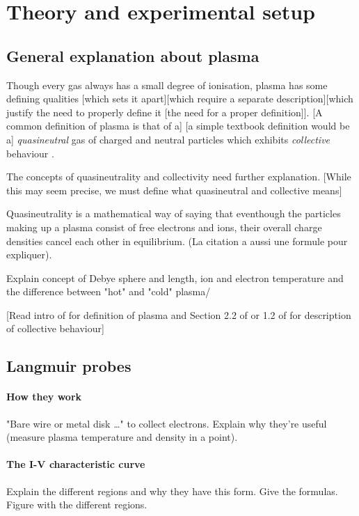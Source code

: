 \section{Theory and experimental setup}

\subsection{General explanation about plasma}
Though every gas always has a small degree of ionisation, plasma has some defining qualities [which sets it apart][which require a separate description][which justify the need to properly define it [the need for a proper definition]].
[A common definition of plasma is that of a] [a simple textbook definition would be a] \emph{quasineutral} gas of charged and neutral particles which exhibits \emph{collective} behaviour \cite{chen_introduction_1990}.

The concepts of quasineutrality and collectivity need further explanation.
[While this may seem precise, we must define what quasineutral and collective means]

Quasineutrality is a mathematical way of saying that eventhough the particles making up a plasma consist of free electrons and ions, 
their overall charge densities cancel each other in equilibrium\cite{gibbon_introduction_2016}.
(La citation a aussi une formule pour expliquer).


Explain concept of Debye sphere and length, ion and electron temperature and the difference between "hot" and "cold" plasma/

[Read intro of \cite{chen_introduction_1990} for definition of plasma and Section 2.2 of \cite{piel_plasma_2017} or 1.2 of \cite{chen_introduction_1990}for description of collective behaviour]

\subsection{Langmuir probes}
\paragraph{How they work}
"Bare wire or metal disk \ldots" to collect electrons.
Explain why they're useful (measure plasma temperature and density in a point).

\paragraph{The I-V characteristic curve}
Explain the different regions and why they have this form.
Give the formulas.
Figure with the different regions.

